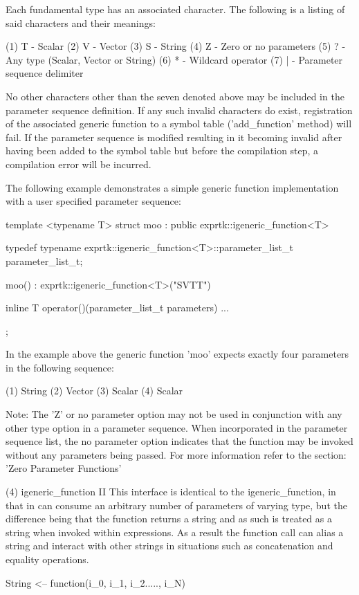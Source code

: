 Each fundamental type has an  associated character. The following is a
listing of said characters and their meanings:

(1) T - Scalar
(2) V - Vector
(3) S - String
(4) Z - Zero or no parameters
(5) ? - Any type (Scalar, Vector or String)
(6) * - Wildcard operator
(7) | - Parameter sequence delimiter


No other characters other than the seven denoted above may be included
in the parameter sequence  definition. If any such  invalid characters
do exist, registration of the associated generic function to a  symbol
table ('add\_function' method) will fail. If the parameter sequence  is
modified resulting in it becoming  invalid after having been added  to
the symbol table but before the compilation step, a compilation  error
will be incurred.

The  following   example  demonstrates   a  simple   generic  function
implementation with a user specified parameter sequence:

template <typename T>
struct moo : public exprtk::igeneric\_function<T>
{
typedef typename exprtk::igeneric\_function<T>::parameter\_list\_t
parameter\_list\_t;

moo()
: exprtk::igeneric\_function<T>("SVTT")
{}

inline T operator()(parameter\_list\_t parameters)
{
	...
}
};


In the example above the  generic function 'moo' expects exactly  four
parameters in the following sequence:

(1) String
(2) Vector
(3) Scalar
(4) Scalar

Note: The  'Z' or  no parameter option may not be  used in conjunction
with any other type option in a parameter sequence. When  incorporated
in the parameter sequence list, the no parameter option indicates that
the function may be invoked  without any parameters being passed.  For
more information refer to the section: 'Zero Parameter Functions'


(4) igeneric\_function II
This interface is identical to  the igeneric\_function, in that in  can
consume an  arbitrary number  of parameters  of varying  type, but the
difference being  that the  function returns  a string  and as such is
treated as a string when  invoked within expressions. As a  result the
function call can  alias a string  and interact with  other strings in
situations such as concatenation and equality operations.

String <-- function(i\_0, i\_1, i\_2....., i\_N)


